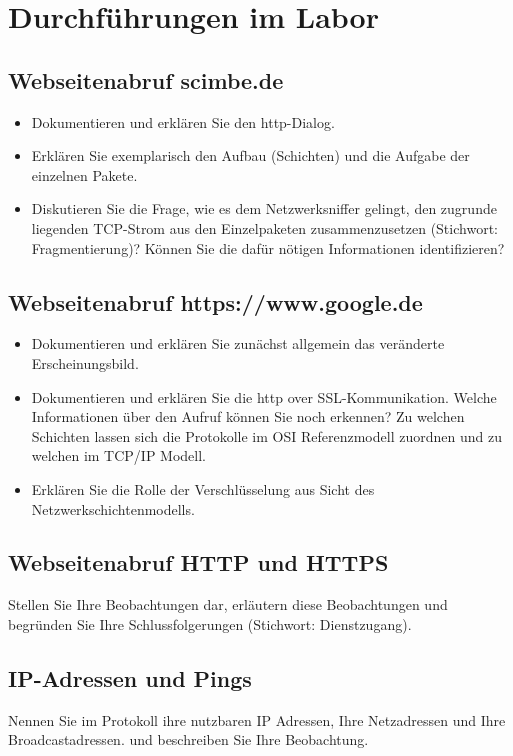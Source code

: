 \documentclass[paper=a4, fontsize=11pt]{scrreprt}
\numberwithin{equation}{section}
\numberwithin{figure}{section}
\numberwithin{table}{section}
\begin{document}
\section{Durchführungen im Labor}

\subsection{Webseitenabruf scimbe.de}

\begin{itemize}
	\item Dokumentieren und erklären Sie den http-Dialog.
    \item Erklären Sie exemplarisch den Aufbau (Schichten) und die Aufgabe der einzelnen Pakete.
    \item Diskutieren Sie die Frage, wie es dem Netzwerksniffer gelingt, den zugrunde liegenden TCP-Strom aus den Einzelpaketen zusammenzusetzen (Stichwort: Fragmentierung)? Können Sie die dafür nötigen Informationen identifizieren?
\end{itemize}

\subsection{Webseitenabruf https://www.google.de}

\begin{itemize}
	\item Dokumentieren und erklären Sie zunächst allgemein das veränderte Erscheinungsbild.
	\item Dokumentieren und erklären Sie die http over SSL-Kommunikation. Welche Informationen über den
Aufruf können Sie noch erkennen? Zu welchen Schichten lassen sich die Protokolle im OSI
Referenzmodell zuordnen und zu welchen im TCP/IP Modell.
	\item Erklären Sie die Rolle der Verschlüsselung aus Sicht des Netzwerkschichtenmodells.
\end{itemize}

\subsection{Webseitenabruf HTTP und HTTPS}

Stellen Sie Ihre Beobachtungen dar, erläutern diese Beobachtungen und begründen Sie Ihre Schlussfolgerungen
(Stichwort: Dienstzugang).

\subsection{IP-Adressen und Pings}

Nennen Sie im Protokoll ihre nutzbaren IP Adressen, Ihre Netzadressen und Ihre Broadcastadressen. und
beschreiben Sie Ihre Beobachtung.
\end{document}
